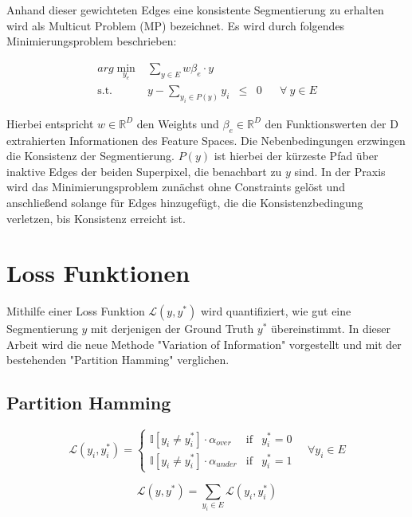 Anhand dieser gewichteten Edges eine konsistente Segmentierung zu erhalten wird als Multicut Problem (MP) bezeichnet. Es wird durch folgendes Minimierungsproblem beschrieben: 


\begin{equation} 
\begin{array}{rrclcl}
\displaystyle arg \min_{y_e} & \sum\limits_{y \in E} w \beta_e \cdot y \\
\textrm{s.t.} &  y - \sum\limits_{y_i \in P(y)} y_i & \le & 0 & & \forall \ y \in E
\end{array}
\end{equation}

Hierbei entspricht $w \in \mathbb{R}^D$ den Weights und $\beta_e \in \mathbb{R}^D$ den Funktionswerten der D extrahierten Informationen des Feature Spaces. Die Nebenbedingungen erzwingen die Konsistenz der Segmentierung. $P(y)$ ist hierbei der kürzeste Pfad über inaktive Edges der beiden Superpixel, die benachbart zu $y$ sind. In der Praxis wird das Minimierungsproblem zunächst ohne Constraints gelöst und anschließend solange für Edges hinzugefügt, die die Konsistenzbedingung verletzen, bis Konsistenz erreicht ist.

\section{Loss Funktionen}

Mithilfe einer Loss Funktion $\mathcal{L}(y, y^*)$ wird quantifiziert, wie gut eine Segmentierung $y$ mit derjenigen der Ground Truth $y^*$ übereinstimmt. In dieser Arbeit wird die neue Methode "Variation of Information" vorgestellt und mit der bestehenden "Partition Hamming" verglichen.

\subsection{Partition Hamming}

\begin{equation}
\mathcal{L}(y_i, y_i^*) = \left\{ \begin{array}{lcc}  
\mathbb{I}[y_i \neq y_i^*] \cdot \alpha_{over} & \text{if} & y_i^* = 0  \\ 
\mathbb{I}[y_i \neq y_i^*] \cdot \alpha_{under} & \text{if} & y_i^* = 1         
\end{array}  \right.  \quad \forall y_i \in E 
\end{equation}

\begin{equation}
\mathcal{L}(y, y^*) = \sum\limits_{y_i \in E} \mathcal{L}(y_i, y_i^*)
\end{equation}


